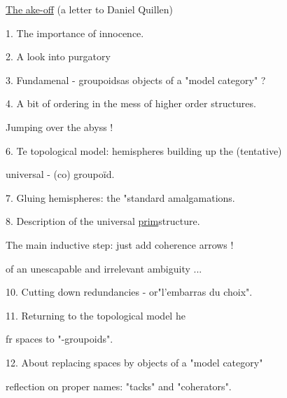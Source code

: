  \uline{The ake-off} (a letter to Daniel Quillen)\par
1. The importance of innocence.\par
2. A  look into purgatory\par
3. Fundamenal \hand{$\infty$}- groupoidsas objects of a "model category" ?\par
4. A bit of ordering in the mess of higher order structures.\par
{} Jumping over the abyss !\par
6. Te topological model: hemispheres building up the (tentative)\par
{}universal \hand{$\infty$}- (co) groupoïd.\par
7. Gluing hemispheres: the "standard amalgamations.\par
8. Description of the universal \uline{prim}\hand{/}structure.\par
{} The main inductive step: just add coherence arrows !    \par
{}  of an \hand{(}unescapable and irrelevant\hand{)} ambiguity ...\par
10. Cutting down redundancies - or\hand{:}"l'embarras du choix".\par
11. Returning to the topological model \hand{(} he  \par
{} fr spaces to "\unsure{$\infty$}-groupoids"\hand{)}.\par
12. About replacing spaces by objects of a "model category" \par
{}   reflection on proper names: "tacks" and "coherators".\par
